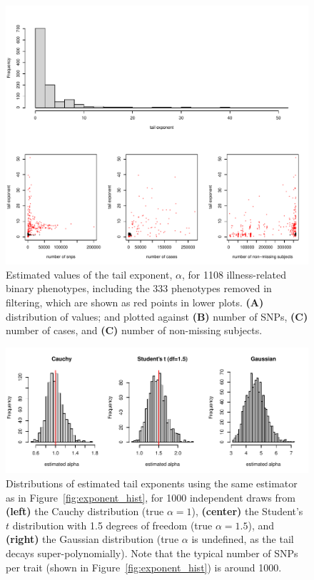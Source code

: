 \documentclass{article}
\newcommand{\1}{\mathbbm{1}}
\theoremstyle{remark}
\theoremstyle{definition}
\begin{document}
\begin{figure}
    \begin{center}
    \includegraphics{snp_effects/unfiltered_results_10}
    \end{center}
    \caption{
        Estimated values of the tail exponent, $\alpha$,
        for 1108 illness-related binary phenotypes,
        including the 333 phenotypes removed in filtering,
        which are shown as red points in lower plots.
        \textbf{(A)} distribution of values; and plotted against
        \textbf{(B)} number of SNPs,
        \textbf{(C)} number of cases, and
        \textbf{(C)} number of non-missing subjects.
        \label{fig:unfiltered_hist}
    }
\end{figure}

\begin{figure}
    \begin{center}
        \includegraphics{snp_effects/power_demo}
    \end{center}
    \caption{
        Distributions of estimated tail exponents using the same estimator
        as in Figure~\ref{fig:exponent_hist},
        for 1000 independent draws from
        \textbf{(left)} the Cauchy distribution (true $\alpha=1$),
        \textbf{(center)} the Student's $t$ distribution with 1.5 degrees of freedom (true $\alpha=1.5$), and
        \textbf{(right)} the Gaussian distribution (true $\alpha$ is undefined,
        as the tail decays super-polynomially).
        Note that the typical number of SNPs per trait (shown in Figure~\ref{fig:exponent_hist})
        is around 1000.
        \label{fig:power}
    }
\end{figure}
\end{document}

